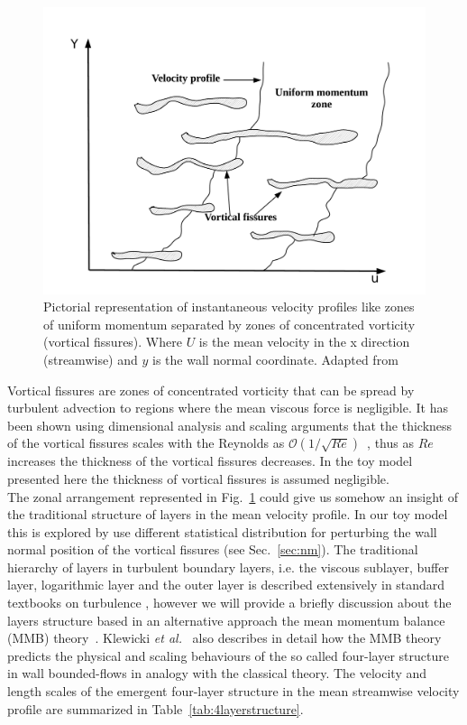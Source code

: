 \documentclass[aps,reprint,amsmath,amssymb,pra,floatfix]{revtex4-1}%
\begin{document}
\begin{figure}[b]
\includegraphics[scale=0.305]{figures/uniform_velocity_vortical_fissures}
\caption{\label{fig:vortical_fissures} Pictorial representation of instantaneous velocity profiles like zones of uniform momentum separated by zones of concentrated vorticity (vortical fissures). Where $U$ is the mean velocity in the x direction (streamwise) and $y$ is the wall normal coordinate.
Adapted from~\citep{priya2007}}
\end{figure} 
Vortical fissures are zones of concentrated vorticity that can
be spread by turbulent advection to regions where the mean viscous force is negligible. It has been shown using dimensional
analysis and scaling arguments that the thickness of the vortical fissures scales with the Reynolds as $\mathcal{O}(1/\sqrt{Re})$~\citep{tennekes1968}, thus as $Re$ increases the thickness of the vortical fissures decreases. In the toy model presented here the thickness of vortical fissures is assumed negligible.\\ 
The zonal arrangement represented in Fig.~\ref{fig:vortical_fissures} could give us somehow an insight of the traditional structure of layers in the mean velocity profile. In our toy model this is explored by use different statistical distribution for perturbing the wall normal position of the vortical fissures (see Sec.~\ref{sec:nm}). 
The traditional hierarchy of layers in turbulent boundary layers, i.e. the viscous sublayer, buffer layer, logarithmic layer and the outer layer is described extensively in standard textbooks on turbulence \cite{tenelumley,pa,mathieu}, however we will provide a briefly discussion about the layers structure based in an alternative approach the mean momentum balance (MMB) theory~\citep{wei2005,fife2005}. Klewicki \textit{et al.}~\citep{Klewickimmb} also describes in detail how the MMB theory predicts the physical and scaling behaviours of the so called four-layer structure in wall bounded-flows in analogy with the classical theory.  The velocity and  length scales of the emergent four-layer structure in the mean streamwise velocity profile are summarized in Table~\ref{tab:4layerstructure}.
\end{document}
